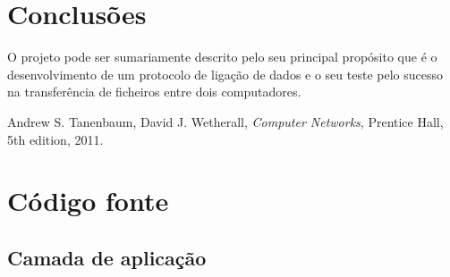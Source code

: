 \documentclass[a4paper,11pt,titlepage]{article}
\begin{document}
\section{Conclusões}

O projeto pode ser sumariamente descrito pelo seu principal propósito que é o desenvolvimento de um protocolo de ligação de dados e o seu teste pelo sucesso na transferência de ficheiros entre dois computadores. 

\begin{thebibliography}{9}
  Andrew S. Tanenbaum,
  David J. Wetherall,
  \emph{Computer Networks},
  Prentice Hall, 
  5th edition,
  2011.
\end{thebibliography}

\appendix
\section{Código fonte}
\subsection{Camada de aplicação}
\end{document}
